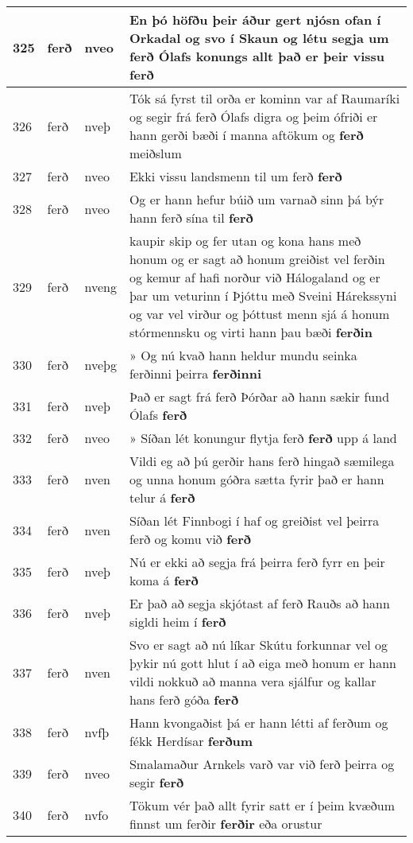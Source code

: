 \documentclass{article}
\begin{document}
\begin{longtable}{p{1cm}|p{1cm}|p{1cm}|p{13cm}}
\hline
325&ferð&nveo&En þó höfðu þeir áður gert njósn ofan í Orkadal og svo í Skaun og létu segja um ferð Ólafs konungs allt það er þeir vissu \textbf{ferð} \\
\hline
326&ferð&nveþ&Tók sá fyrst til orða er kominn var af Raumaríki og segir frá ferð Ólafs digra og þeim ófriði er hann gerði bæði í manna aftökum og \textbf{ferð} meiðslum\\
\hline
327&ferð&nveo&Ekki vissu landsmenn til um ferð \textbf{ferð} \\
\hline
328&ferð&nveo&Og er hann hefur búið um varnað sinn þá býr hann ferð sína til \textbf{ferð} \\
\hline
329&ferð&nveng&kaupir skip og fer utan og kona hans með honum og er sagt að honum greiðist vel ferðin og kemur af hafi norður við Hálogaland og er þar um veturinn í Þjóttu með Sveini Hárekssyni og var vel virður og þóttust menn sjá á honum stórmennsku og virti hann þau bæði \textbf{ferðin} \\
\hline
330&ferð&nveþg&» Og nú kvað hann heldur mundu seinka ferðinni þeirra \textbf{ferðinni} \\
\hline
331&ferð&nveþ&Það er sagt frá ferð Þórðar að hann sækir fund Ólafs \textbf{ferð} \\
\hline
332&ferð&nveo&» Síðan lét konungur flytja ferð \textbf{ferð} upp á land\\
\hline
333&ferð&nven&Vildi eg að þú gerðir hans ferð hingað sæmilega og unna honum góðra sætta fyrir það er hann telur á \textbf{ferð} \\
\hline
334&ferð&nven&Síðan lét Finnbogi í haf og greiðist vel þeirra ferð og komu við \textbf{ferð} \\
\hline
335&ferð&nveþ&Nú er ekki að segja frá þeirra ferð fyrr en þeir koma á \textbf{ferð} \\
\hline
336&ferð&nveþ&Er það að segja skjótast af ferð Rauðs að hann sigldi heim í \textbf{ferð} \\
\hline
337&ferð&nven&Svo er sagt að nú líkar Skútu forkunnar vel og þykir nú gott hlut í að eiga með honum er hann vildi nokkuð að manna vera sjálfur og kallar hans ferð góða \textbf{ferð} \\
\hline
338&ferð&nvfþ&Hann kvongaðist þá er hann létti af ferðum og fékk Herdísar \textbf{ferðum} \\
\hline
339&ferð&nveo&Smalamaður Arnkels varð var við ferð þeirra og segir \textbf{ferð} \\
\hline
340&ferð&nvfo&Tökum vér það allt fyrir satt er í þeim kvæðum finnst um ferðir \textbf{ferðir} eða orustur\\

\end{longtable}
\end{document}
